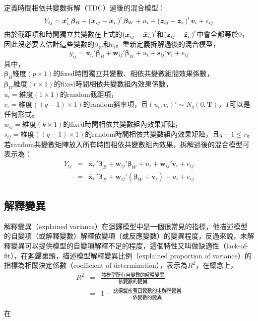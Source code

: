 定義時間相依共變數拆解（TDC）過後的混合模型：
\begin{equation}\label{eq:mix.tdc1}
Y_{ij}=\bar{\bm x}_{i.}'\bm\beta_B+\left(\bm x_{ij}-\bar{\bm x}_{i.}\right)'\bm\beta_W+u_i+\left(\bm z_{ij}-\bar{\bm z}_{i.}\right)'\bm v_i+e_{ij}
\end{equation}
由於截距項和時間獨立共變數在上式的$\left(\bm x_{ij}-\bar{\bm x}_{i.}\right)'$和$\left(\bm z_{ij}-\bar{\bm z}_{i.}\right)'$中會全都等於$0$，因此沒必要去估計這些變數的$\beta_W$和$v_i$。重新定義拆解過後的混合模型，
\begin{equation}\label{eq:mix.tdc2}
y_{ij}=\bar{\bm x}_{i.}'\bm\beta_B+\bm w_{ij}'\bm\beta_W+u_i+\bm s_{ij}'\bm v_i+e_{ij}
\end{equation}
其中，\\
$\bm\beta_B$維度$(p\times1)$的fixed時間獨立共變數、相依共變數組間效果係數，\\
$\bm\beta_W$維度$(r\times1)$的fixed時間相依共變數組內效果係數，\\
$u_i=$維度$(1\times1)$的random截距項，\\
$v_i=$維度$((q-1)\times1)$的random斜率項，且$(u_i, v_i)'\sim N_q(0,\bm T)$，$T$可以是任何形式。\\
$w_{ij}=$維度$(k\times1)$的fixed時間相依共變數組內效果矩陣，\\
$s_{ij}=$維度$((q-1)\times1)$的random時間相依共變數組內效果矩陣，且$q-1\leq r$。 \\
若random共變數矩陣放入所有時間相依共變數組內效果，拆解過後的混合模型可表示為：
\begin{eqnarray}\label{eq:mix.tdc3}
Y_{ij} &=& \bar{\bm x}_{i.}'\bm\beta_B+\bm w_{ij}'\bm\beta_W+u_i+\bm w_{ij}'\bm v_i+e_{ij} \\
       &=& \bar{\bm x}_{i.}'\bm\beta_B+\bm w_{ij}'(\bm\beta_W+\bm v_i)+u_i+e_{ij} \nonumber 
\end{eqnarray}




\newpage 
\subsection{解釋變異}
解釋變異（explained variance）在迴歸模型中是一個很常見的指標，他描述模型的自變項（或解釋變數）解釋依變項（或反應變數）的變異程度，反過來說，未解釋變異可以提供模型的自變項解釋不足的程度，這個特性又叫做缺適性（lack-of-fit），在迴歸裏頭，描述模型解釋變異比例（explained proportion of variance）的指標為相關決定係數（coefficient of determination），表示為$R^2$，在概念上，
\begin{eqnarray}
R^2 &=& \frac{\text{該模型所有自變數的解釋變異}}{\text{依變數的變異}}\nonumber \\
&=& 1-\frac{\text{該模型所有自變數的未解釋變異}}{\text{依變數的變異}}\nonumber 
\end{eqnarray}\par
在


